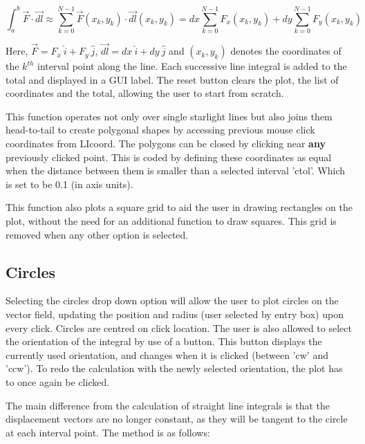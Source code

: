 \documentclass[12pt]{report}
\begin{document}
\begin{equation}
	\int_{a}^{b} \vec{F} \cdot \vec{dl} \approx \sum_{k=0}^{N-1} \vec{F}(x_k,y_k) \cdot \vec{dl}(x_k,y_k) = dx \sum_{k=0}^{N-1} F_x(x_k,y_k) + dy \sum_{k=0}^{N-1} F_y(x_k,y_k)
\end{equation}

Here, $\vec{F} = F_x \ \hat{i} + F_y \ \hat{j}$, $\vec{dl} = dx \ \hat{i} + dy \ \hat{j}$ and $(x_k,y_k)$ denotes the coordinates of the $k^{th}$ interval point along the line. Each successive line integral is added to the total and displayed in a GUI label. The reset button clears the plot, the list of coordinates and the total, allowing the user to start from scratch.

\noindent This function operates not only over single starlight lines but also joins them head-to-tail to create polygonal shapes by accessing previous mouse click coordinates from LI\textunderscore coord. The polygons can be closed by clicking near \textbf{any} previously clicked point. This is coded by defining these coordinates as equal when the distance between them is smaller than a selected interval 'ctol'. Which is set to be 0.1 (in axis units).

\noindent This function also plots a square grid to aid the user in drawing rectangles on the plot, without the need for an additional function to draw squares. This grid is removed when any other option is selected. 

\subsection{Circles}

Selecting the circles drop down option will allow the user to plot circles on the vector field, updating the position and radius (user selected by entry box) upon every click. Circles are centred on click location. The user is also allowed to select the orientation of the integral by use of a button. This button displays the currently used orientation, and changes when it is clicked (between 'cw' and 'ccw'). To redo the calculation with the newly selected orientation, the plot has to once again be clicked.

The main difference from the calculation of straight line integrals is that the displacement vectors are no longer constant, as they will be tangent to the circle at each interval point. The method is as follows: 
\end{document}
